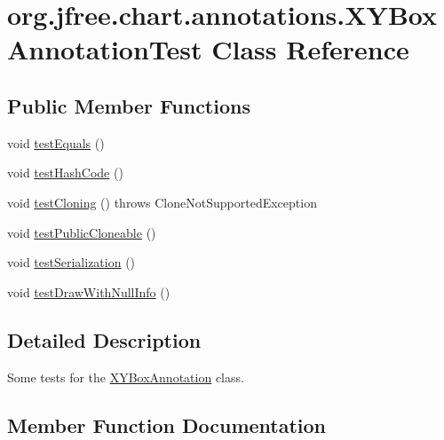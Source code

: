 \hypertarget{classorg_1_1jfree_1_1chart_1_1annotations_1_1_x_y_box_annotation_test}{}\section{org.\+jfree.\+chart.\+annotations.\+X\+Y\+Box\+Annotation\+Test Class Reference}
\label{classorg_1_1jfree_1_1chart_1_1annotations_1_1_x_y_box_annotation_test}
\subsection*{Public Member Functions}
\begin{DoxyCompactItemize}
\item 
void \mbox{\hyperlink{classorg_1_1jfree_1_1chart_1_1annotations_1_1_x_y_box_annotation_test_ab145b6dcf4c49e3b6c38f35f046afb72}{test\+Equals}} ()
\item 
void \mbox{\hyperlink{classorg_1_1jfree_1_1chart_1_1annotations_1_1_x_y_box_annotation_test_a72eed390e4595808c8de41733a13c26c}{test\+Hash\+Code}} ()
\item 
void \mbox{\hyperlink{classorg_1_1jfree_1_1chart_1_1annotations_1_1_x_y_box_annotation_test_adf5af11fd1334718b2825e8465eeacef}{test\+Cloning}} ()  throws Clone\+Not\+Supported\+Exception 
\item 
void \mbox{\hyperlink{classorg_1_1jfree_1_1chart_1_1annotations_1_1_x_y_box_annotation_test_a8df5768c0cef7a0738fb2f33c0a0668b}{test\+Public\+Cloneable}} ()
\item 
void \mbox{\hyperlink{classorg_1_1jfree_1_1chart_1_1annotations_1_1_x_y_box_annotation_test_ad46dc7e94277b9588a2e9457ecbd01e8}{test\+Serialization}} ()
\item 
void \mbox{\hyperlink{classorg_1_1jfree_1_1chart_1_1annotations_1_1_x_y_box_annotation_test_a51ff7e56a3801fcd664b5e9b97ff07cc}{test\+Draw\+With\+Null\+Info}} ()
\end{DoxyCompactItemize}


\subsection{Detailed Description}
Some tests for the \mbox{\hyperlink{classorg_1_1jfree_1_1chart_1_1annotations_1_1_x_y_box_annotation}{X\+Y\+Box\+Annotation}} class. 

\subsection{Member Function Documentation}
\mbox{\label{classorg_1_1jfree_1_1chart_1_1annotations_1_1_x_y_box_annotation_test_adf5af11fd1334718b2825e8465eeacef}} 
